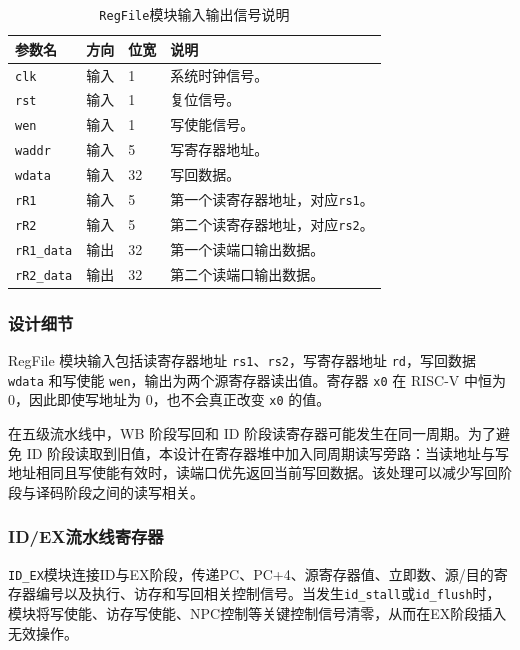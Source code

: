 \documentclass[12pt,a4paper]{ctexart}
\newcommand{\code}[1]{\texttt{#1}}
\begin{document}
\begin{table}[H]
	\centering
	\caption{\code{RegFile}模块输入输出信号说明}
	\footnotesize
	\renewcommand{\arraystretch}{1.15}
	\begin{tabularx}{\textwidth}{p{3.2cm}p{1.5cm}p{2.1cm}X}
		\toprule
		参数名              & 方向 & 位宽 & 说明                      \\
		\midrule
		\code{clk}       & 输入 & 1  & 系统时钟信号。                 \\
		\code{rst}       & 输入 & 1  & 复位信号。                   \\
		\code{wen}       & 输入 & 1  & 写使能信号。                  \\
		\code{waddr}     & 输入 & 5  & 写寄存器地址。                 \\
		\code{wdata}     & 输入 & 32 & 写回数据。                   \\
		\code{rR1}       & 输入 & 5  & 第一个读寄存器地址，对应\code{rs1}。 \\
		\code{rR2}       & 输入 & 5  & 第二个读寄存器地址，对应\code{rs2}。 \\
		\code{rR1\_data} & 输出 & 32 & 第一个读端口输出数据。             \\
		\code{rR2\_data} & 输出 & 32 & 第二个读端口输出数据。             \\
		\bottomrule
	\end{tabularx}
\end{table}

\subsubsection*{设计细节}

RegFile 模块输入包括读寄存器地址 \code{rs1}、\code{rs2}，写寄存器地址 \code{rd}，写回数据 \code{wdata} 和写使能 \code{wen}，输出为两个源寄存器读出值。寄存器 \code{x0} 在 RISC-V 中恒为 0，因此即使写地址为 0，也不会真正改变 \code{x0} 的值。

在五级流水线中，WB 阶段写回和 ID 阶段读寄存器可能发生在同一周期。为了避免 ID 阶段读取到旧值，本设计在寄存器堆中加入同周期读写旁路：当读地址与写地址相同且写使能有效时，读端口优先返回当前写回数据。该处理可以减少写回阶段与译码阶段之间的读写相关。

\subsubsection{ID/EX流水线寄存器}

\code{ID\_EX}模块连接ID与EX阶段，传递PC、PC+4、源寄存器值、立即数、源/目的寄存器编号以及执行、访存和写回相关控制信号。当发生\code{id\_stall}或\code{id\_flush}时，模块将写使能、访存写使能、NPC控制等关键控制信号清零，从而在EX阶段插入无效操作。
\end{document}
